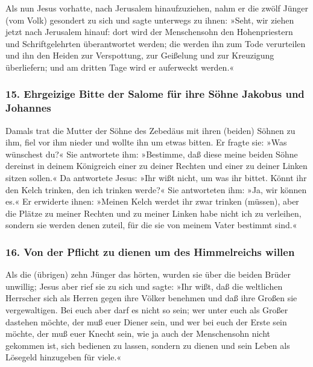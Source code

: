  Als nun Jesus vorhatte, nach Jerusalem hinaufzuziehen,
nahm er die zwölf Jünger (vom Volk) gesondert zu sich und sagte
unterwegs zu ihnen:  »Seht, wir ziehen jetzt nach
Jerusalem hinauf: dort wird der Menschensohn den Hohenpriestern und
Schriftgelehrten überantwortet werden; die werden ihn zum Tode
verurteilen  und ihn den Heiden zur Verspottung, zur
Geißelung und zur Kreuzigung überliefern; und am dritten Tage wird er
auferweckt werden.«

\hypertarget{ehrgeizige-bitte-der-salome-fuxfcr-ihre-suxf6hne-jakobus-und-johannes}{%
\subsubsection{15. Ehrgeizige Bitte der Salome für ihre Söhne Jakobus
und
Johannes}\label{ehrgeizige-bitte-der-salome-fuxfcr-ihre-suxf6hne-jakobus-und-johannes}}

 Damals trat die Mutter der Söhne des Zebedäus mit ihren
(beiden) Söhnen zu ihm, fiel vor ihm nieder und wollte ihn um etwas
bitten.  Er fragte sie: »Was wünschest du?« Sie
antwortete ihm: »Bestimme, daß diese meine beiden Söhne dereinst in
deinem Königreich einer zu deiner Rechten und einer zu deiner Linken
sitzen sollen.«  Da antwortete Jesus: »Ihr wißt nicht, um
was ihr bittet. Könnt ihr den Kelch trinken, den ich trinken werde?« Sie
antworteten ihm: »Ja, wir können es.«  Er erwiderte
ihnen: »Meinen Kelch werdet ihr zwar trinken (müssen), aber die Plätze
zu meiner Rechten und zu meiner Linken habe nicht ich zu verleihen,
sondern sie werden denen zuteil, für die sie von meinem Vater bestimmt
sind.«

\hypertarget{von-der-pflicht-zu-dienen-um-des-himmelreichs-willen}{%
\subsubsection{16. Von der Pflicht zu dienen um des Himmelreichs
willen}\label{von-der-pflicht-zu-dienen-um-des-himmelreichs-willen}}

 Als die (übrigen) zehn Jünger das hörten, wurden sie
über die beiden Brüder unwillig;  Jesus aber rief sie zu
sich und sagte: »Ihr wißt, daß die weltlichen Herrscher sich als Herren
gegen ihre Völker benehmen und daß ihre Großen sie vergewaltigen.
 Bei euch aber darf es nicht so sein; wer unter euch als
Großer dastehen möchte, der muß euer Diener sein,  und
wer bei euch der Erste sein möchte, der muß euer Knecht sein,
 wie ja auch der Menschensohn nicht gekommen ist, sich
bedienen zu lassen, sondern zu dienen und sein Leben als Lösegeld
hinzugeben für viele.«

